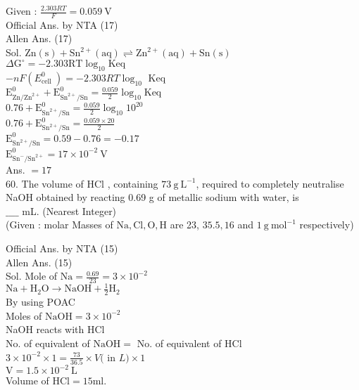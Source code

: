 \documentclass[10pt]{article}
\begin{document}
Given : \(\frac{2.303 R T}{F}=0.059 \mathrm{~V}\)\\
Official Ans. by NTA (17)\\
Allen Ans. (17)\\
Sol. \(\mathrm{Zn}(\mathrm{s})+\mathrm{Sn}^{2+}(\mathrm{aq}) \rightleftharpoons \mathrm{Zn}^{2+}(\mathrm{aq})+\mathrm{Sn}(\mathrm{s})\)\\
\(\Delta \mathrm{G}^{\circ}=-2.303 \mathrm{RT} \log _{10} \mathrm{Keq}\)\\
\(-n F\left(E_{\text {cell }}^{0}\right)=-2.303 R T \log _{10}\) Keq\\
\(\mathrm{E}_{\mathrm{Zn} / \mathrm{Zn}^{2+}}^{0}+\mathrm{E}_{\mathrm{Sn}^{2+} / \mathrm{Sn}}^{0}=\frac{0.059}{2} \log _{10} \mathrm{Keq}\)\\
\(0.76+\mathrm{E}_{\mathrm{Sn}^{2+} / \mathrm{Sn}}^{0}=\frac{0.059}{2} \log _{10} 10^{20}\)\\
\(0.76+\mathrm{E}_{\mathrm{Sn}^{2+} / \mathrm{Sn}}^{0}=\frac{0.059 \times 20}{2}\)\\
\(\mathrm{E}_{\mathrm{Sn}^{2+} / \mathrm{Sn}}^{0}=0.59-0.76=-0.17\)\\
\(\mathrm{E}_{\mathrm{Sn}^{-} / \mathrm{Sn}^{2+}}^{0}=17 \times 10^{-2} \mathrm{~V}\)\\
Ans. \(=17\)\\
60. The volume of HCl , containing \(73 \mathrm{~g} \mathrm{~L}^{-1}\), required to completely neutralise NaOH obtained by reacting 0.69 g of metallic sodium with water, is\\
\(\_\_\_\_\) mL. (Nearest Integer)\\
(Given : molar Masses of \(\mathrm{Na}, \mathrm{Cl}, \mathrm{O}, \mathrm{H}\) are 23, \(35.5,16\) and \(1 \mathrm{~g} \mathrm{~mol}^{-1}\) respectively)

Official Ans. by NTA (15)\\
Allen Ans. (15)\\
Sol. Mole of \(\mathrm{Na}=\frac{0.69}{23}=3 \times 10^{-2}\)\\
\(\mathrm{Na}+\mathrm{H}_{2} \mathrm{O} \longrightarrow \mathrm{NaOH}+\frac{1}{2} \mathrm{H}_{2}\)\\
By using POAC\\
Moles of \(\mathrm{NaOH}=3 \times 10^{-2}\)\\
NaOH reacts with HCl\\
No. of equivalent of \(\mathrm{NaOH}=\) No. of equivalent of HCl\\
\(3 \times 10^{-2} \times 1=\frac{73}{36.5} \times V(\) in \(L) \times 1\)\\
\(\mathrm{V}=1.5 \times 10^{-2} \mathrm{~L}\)\\
Volume of \(\mathrm{HCl}=15 \mathrm{ml}\).
\end{document}
